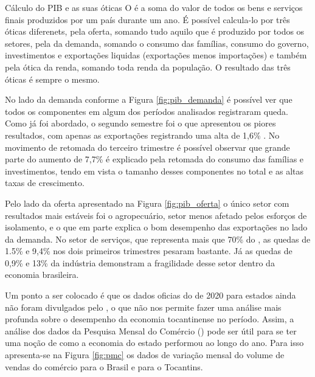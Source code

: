 \begin{smbox}[label={labelbox},nameref={Cálculo do PIB e as suas óticas}]{Cálculo do PIB e as suas óticas}
	O  é a soma do valor de todos os bens e serviços finais produzidos por um país durante um ano. É possível calcula-lo por três óticas diferenets, pela oferta, somando tudo aquilo que é produzido por todos os setores, pela da demanda, somando o consumo das famílias, consumo do governo, investimentos e exportações liquidas (exportações menos importações) e também pela ótica da renda, somando toda renda da população. O resultado das três óticas é sempre o mesmo.
\end{smbox}
\par No lado da demanda conforme a Figura \ref{fig:pib_demanda} é possível ver que todos os componentes em algum dos períodos analisados registraram queda. Como já foi abordado, o segundo semestre foi o que apresentou os piores resultados, com apenas as exportações registrando uma alta de 1,6\% . No movimento de retomada do terceiro trimestre é possível observar que grande parte do aumento de 7,7\% é explicado pela retomada do consumo das famílias e investimentos, tendo em vista o tamanho desses componentes no  total e as altas taxas de crescimento.
\par Pelo lado da oferta apresentado na Figura \ref{fig:pib_oferta} o único setor com resultados mais estáveis foi o agropecuário, setor menos afetado pelos esforços de isolamento, e o que em parte explica o bom desempenho das exportações no lado da demanda. No setor de serviços, que representa mais que 70\% do , as quedas de 1.5\% e 9,4\% nos dois primeiros trimestres pesaram bastante. Já as quedas de 0,9\% e 13\% da indústria demonstram a fragilidade desse setor dentro da economia brasileira.
\par Um ponto a ser colocado é que os dados oficias do  de 2020 para estados ainda não foram divulgados pelo , o que não nos permite fazer uma análise mais profunda sobre o desempenho da economia tocantinense no período. Assim, a análise dos dados da Pesquisa Mensal do Comércio () pode ser útil para se ter uma noção de como a economia do estado performou ao longo do ano. Para isso apresenta-se na Figura \ref{fig:pmc} os dados de variação mensal do volume de vendas do comércio para o Brasil e para o Tocantins.

